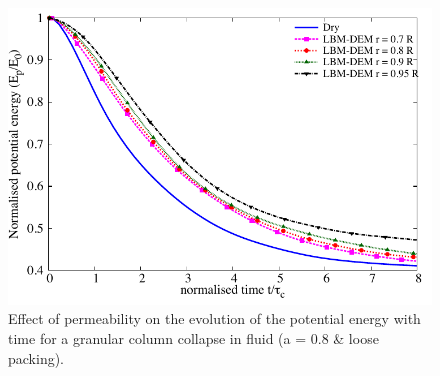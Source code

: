 \documentclass[12pt,a4paper,twocolumn,fleqn]{narms}
\begin{document}
\begin{figure}
	\centering
    \includegraphics[width=0.8\linewidth]{figs/PE_a08_loose}
    \caption{Effect of permeability on the evolution of the potential energy 
    with time for a granular column collapse in fluid (a = 0.8 \& loose 
    packing).}
    \label{fig:PE_a08_loose}
\end{figure}
\end{document}
